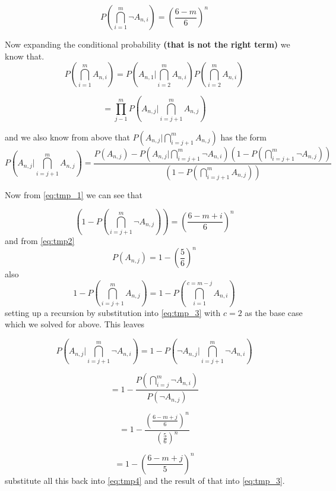 \documentclass[12pt,a4paper]{article}
\begin{document}
\begin{equation}
P\left(\bigcap_{i=1}^m \neg A_{n,i}\right) = \left( \frac{6-m}{6} \right)^n
\label{eq:tmp_1}
\end{equation}

Now expanding the conditional probability \textbf{(that is not the right term)} we know that.
\begin{equation}
P\left(\bigcap_{i=1}^m A_{n,i}\right) = P\left(A_{n,1}|\bigcap_{i=2}^m A_{n,i}\right)P\left(\bigcap_{i=2}^m A_{n,i}\right)
\label{eq:tmp_3}
\end{equation}

\begin{equation}
= \prod_{j-1}^m P\left(A_{n,j}|\bigcap_{i=j+1}^m A_{n,j}\right)
\end{equation}

and we also know from above that $P\left(A_{n,j}|\bigcap_{i=j+1}^m A_{n,j}\right)$ has the form
\begin{equation}
P\left(A_{n,j}|\bigcap_{i=j+1}^m A_{n,j}\right) = \frac{P(A_{n,j}) - P(A_{n,j} | \bigcap_{i=j+1}^m \neg A_{n,i})\left(1-P\left(\bigcap_{i=j+1}^m \neg A_{n,j}\right)\right)}{\left(1-P\left(\bigcap_{i=j+1}^m A_{n,j}\right)\right)}
\label{eq:tmp4}
\end{equation}

Now from \cref{eq:tmp_1} we can see that

\begin{equation}
\left( 1-P\left(\bigcap_{i=j+1}^m \neg A_{n,j}\right) \right) = \left(\frac{6-m+i}{6}\right)^n
\end{equation}
and from \cref{eq:tmp2}
\begin{equation}
P(A_{n,j}) = 1-\left( \frac{5}{6} \right)^n
\end{equation}
also
\begin{equation}
1-P\left(\bigcap_{i=j+1}^m A_{n,j}\right) = 1-P\left(\bigcap_{i=1}^{c=m-j} A_{n,i}\right)
\end{equation}
setting up a recursion by substitution into \cref{eq:tmp_3} with $c=2$ as the base case which we solved for above. This leaves

\begin{equation}
P(A_{n,j} | \bigcap_{i=j+1}^m \neg A_{n,i}) = 1 - P(\neg A_{n,j} | \bigcap_{i=j+1}^m \neg A_{n,i})
\end{equation}

\begin{equation}
= 1- \frac{P(\bigcap_{i=j}^m \neg A_{n,i})}{P(\neg A_{n,j})}
\end{equation}

\begin{equation}
= 1- \frac{\left(\frac{6-m+j}{6}\right)^n}{\left(\frac{5}{6}\right)^n}
\end{equation}

\begin{equation}
= 1- \left(\frac{6-m+j}{5}\right)^n
\end{equation}
substitute all this back into \cref{eq:tmp4} and the result of that into \cref{eq:tmp_3}.
\end{document}
